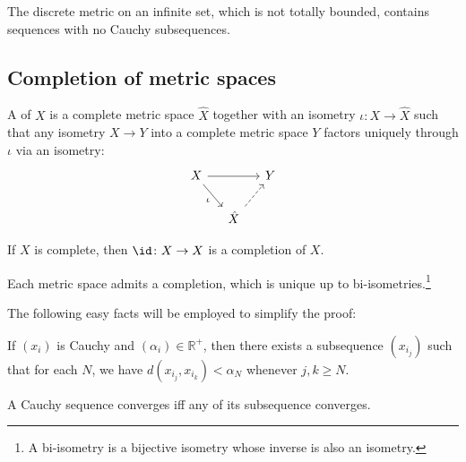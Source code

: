 \begin{rmk}
	The discrete metric on an infinite set, which is not totally bounded, contains sequences with no Cauchy subsequences.
\end{rmk}



\subsection{Completion of metric spaces}

	A  of $X$ is a complete metric space $\hat X$ together with an isometry $\iota\colon X\to \hat X$ such that any isometry $X\to Y$ into a complete metric space $Y$ factors uniquely through $\iota$ via an isometry:
	\[
	\begin{tikzcd}[column sep=small]
		X\ar[rr]\ar[dr, "\iota"'] & & Y\\
		& \hat X\ar[ur, dashed] & 
	\end{tikzcd}
	\]
	
	\begin{cor}
		If $X$ is complete, then $\id\colon X\to X$ is a completion of $X$.
	\end{cor}
	
	\begin{prp}\label{PRP: completion of metric spaces}
		Each metric space admits a completion, which is unique up to bi-isometries.\footnote{
			A bi-isometry is a bijective isometry whose inverse is also an isometry.
		}
	\end{prp}
	
	\noindent The following easy facts will be employed to simplify the proof:
	
	\begin{lem}\label{LEM: some properties of Cauchy sequences}
		\leavevmode
		\begin{mylist}
			\item If $(x_i)$ is Cauchy and $(\alpha_i)\in\mathbb R^+$, then there exists a subsequence $(x_{i_j})$ such that for each $N$, we have $d(x_{i_j}, x_{i_k}) < \alpha_N$ whenever $j, k\ge N$.
			
			\item A Cauchy sequence converges iff any of its subsequence converges.
		\end{mylist}
	\end{lem}
	
